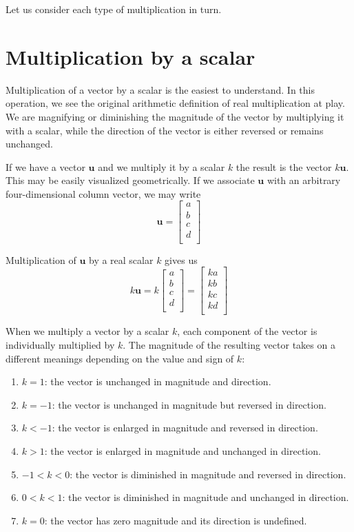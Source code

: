 \documentclass[
  a4paper,
]{article}
\begin{document}
Let us consider each type of multiplication in turn.

\hypertarget{multiplication-by-a-scalar}{%
\section{Multiplication by a scalar}\label{multiplication-by-a-scalar}}

Multiplication of a vector by a scalar is the easiest to understand. In
this operation, we see the original arithmetic definition of real
multiplication at play. We are magnifying or diminishing the magnitude
of the vector by multiplying it with a scalar, while the direction of
the vector is either reversed or remains unchanged.

If we have a vector \(\mathbf{u}\) and we multiply it by a scalar \(k\)
the result is the vector \(k\mathbf{u}\). This may be easily visualized
geometrically. If we associate \(\mathbf{u}\) with an arbitrary
four-dimensional column vector, we may write \[
\mathbf{u} = \begin{bmatrix}a\\b\\c\\d\\\end{bmatrix}
\]

Multiplication of \(\mathbf{u}\) by a real scalar \(k\) gives us \[
k\mathbf{u} = k\begin{bmatrix}a\\b\\c\\d\\\end{bmatrix} = \begin{bmatrix}ka\\kb\\kc\\kd\\\end{bmatrix}
\]

When we multiply a vector by a scalar \(k\), each component of the
vector is individually multiplied by \(k\). The magnitude of the
resulting vector takes on a different meanings depending on the value
and sign of \(k\):

\begin{enumerate}
\item
  \(k = 1\): the vector is unchanged in magnitude and direction.
\item
  \(k = -1\): the vector is unchanged in magnitude but reversed in
  direction.
\item
  \(k < -1\): the vector is enlarged in magnitude and reversed in
  direction.
\item
  \(k > 1\): the vector is enlarged in magnitude and unchanged in
  direction.
\item
  \(-1 < k < 0\): the vector is diminished in magnitude and reversed in
  direction.
\item
  \(0 < k < 1\): the vector is diminished in magnitude and unchanged in
  direction.
\item
  \(k = 0\): the vector has zero magnitude and its direction is
  undefined.
\end{enumerate}
\end{document}
